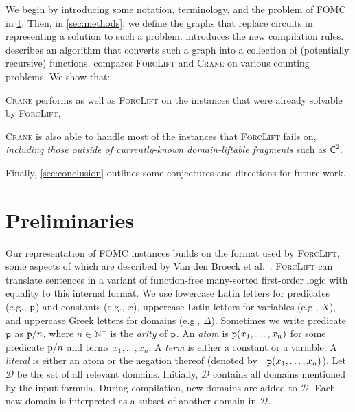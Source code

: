 \documentclass{article}
\newcommand{\Ctwo}{$\mathsf{C}^{2}$}
\newcommand{\predicate}{\texttt{\textup{p}}}
\begin{document}

We begin by introducing some notation, terminology, and the problem of FOMC in
\cref{sec:recprelims}. Then, in \cref{sec:methods}, we define the graphs that
replace circuits in representing a solution to such a problem. 
introduces the new compilation rules.  describes an
algorithm that converts such a graph into a collection of (potentially
recursive) functions.  compares \textsc{ForcLift} and
\textsc{Crane} on various counting problems. We show that:
\begin{enumerate*}[label=(\roman*)]
  \item \textsc{Crane} performs as well as \textsc{ForcLift} on the instances
  that were already solvable by \textsc{ForcLift},
  \item \textsc{Crane} is also able to handle most of the instances that
  \textsc{ForcLift} fails on, \emph{including those outside of currently-known
    domain-liftable fragments} such as \Ctwo{}.
\end{enumerate*}
Finally, \cref{sec:conclusion} outlines some conjectures and directions for
future work.

\section{Preliminaries}\label{sec:recprelims}

Our representation of FOMC instances builds on the format used by
\textsc{ForcLift}, some aspects of which are described by Van den Broeck et
al.~. \textsc{ForcLift} can translate
sentences in a variant of function-free many-sorted first-order logic with
equality to this internal format. We use lowercase Latin letters for predicates
(e.g., $\predicate$) and constants (e.g., $x$), uppercase Latin letters for
variables (e.g., $X$), and uppercase Greek letters for domains (e.g., $\Delta$).
Sometimes we write predicate $\predicate$ as $\predicate/n$, where
$n \in \mathbb{N}^{+}$ is the \emph{arity} of $\predicate$. An \emph{atom} is
$\predicate(x_1, \dots, x_n)$ for some predicate $\predicate/n$ and terms
$x_{1}, \dots, x_{n}$. A \emph{term} is either a constant or a variable. A
\emph{literal} is either an atom or the negation thereof (denoted by
$\neg \predicate(x_1, \dots, x_n)$). Let $\mathcal{D}$ be the set of all
relevant domains. Initially, $\mathcal{D}$ contains all domains mentioned by the
input formula. During compilation, new domains are added to $\mathcal{D}$. Each
new domain is interpreted as a subset of another domain in $\mathcal{D}$.
\end{document}
